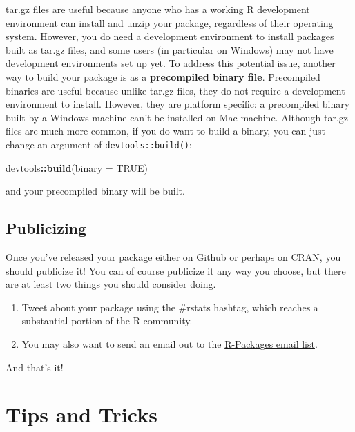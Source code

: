 \documentclass[]{book}
\newenvironment{Shaded}{\begin{snugshade}}{\end{snugshade}}
\newcommand{\KeywordTok}[1]{\textcolor[rgb]{0.13,0.29,0.53}{\textbf{#1}}}
\newcommand{\DataTypeTok}[1]{\textcolor[rgb]{0.13,0.29,0.53}{#1}}
\newcommand{\OtherTok}[1]{\textcolor[rgb]{0.56,0.35,0.01}{#1}}
\newcommand{\OperatorTok}[1]{\textcolor[rgb]{0.81,0.36,0.00}{\textbf{#1}}}
\newcommand{\NormalTok}[1]{#1}
\providecommand{\tightlist}{%
  \setlength{\itemsep}{0pt}\setlength{\parskip}{0pt}}
\begin{document}
tar.gz files are useful because anyone who has a working R development
environment can install and unzip your package, regardless of their
operating system. However, you do need a development environment to
install packages built as tar.gz files, and some users (in particular on
Windows) may not have development environments set up yet. To address
this potential issue, another way to build your package is as a
\textbf{precompiled binary file}. Precompiled binaries are useful
because unlike tar.gz files, they do not require a development
environment to install. However, they are platform specific: a
precompiled binary built by a Windows machine can't be installed on Mac
machine. Although tar.gz files are much more common, if you do want to
build a binary, you can just change an argument of
\texttt{devtools::build()}:

\begin{Shaded}
\begin{Highlighting}[]
\NormalTok{devtools}\OperatorTok{::}\KeywordTok{build}\NormalTok{(}\DataTypeTok{binary =} \OtherTok{TRUE}\NormalTok{)}
\end{Highlighting}
\end{Shaded}

and your precompiled binary will be built.

\subsection{Publicizing}\label{publicizing}

Once you've released your package either on Github or perhaps on CRAN,
you should publicize it! You can of course publicize it any way you
choose, but there are at least two things you should consider doing.

\begin{enumerate}
\def\labelenumi{\arabic{enumi}.}
\tightlist
\item
  Tweet about your package using the \#rstats hashtag, which reaches a
  substantial portion of the R community.
\item
  You may also want to send an email out to the
  \href{https://stat.ethz.ch/mailman/listinfo/r-packages}{R-Packages
  email list}.
\end{enumerate}

And that's it!

\section{Tips and Tricks}\label{tips-and-tricks-1}
\end{document}
